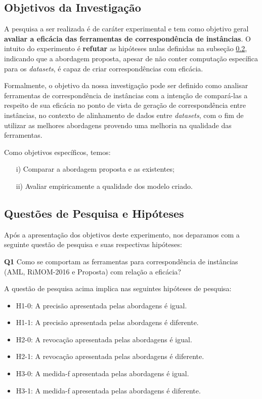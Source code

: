 \subsection{Objetivos da Investigação}
A pesquisa a ser realizada é de caráter experimental e tem como objetivo geral \textbf{avaliar a eficácia das ferramentas de correspondência de instâncias}. O intuito do experimento é \textbf{refutar} as hipóteses nulas definidas na subseção \ref{sub:hipoteses}, indicando que a abordagem proposta, apesar de não conter computação específica para os \textit{datasets}, é capaz de criar correspondências com eficácia.

Formalmente, o objetivo da nossa investigação pode ser definido como analisar ferramentas de correspondência de instâncias com a intenção de compará-las a respeito de sua eficácia no ponto de vista de geração de correspondência entre instâncias, no contexto de alinhamento de dados entre \textit{datasets}, com o fim de utilizar as melhores abordagens provendo uma melhoria na qualidade das ferramentas.

Como objetivos específicos, temos:
\begin{enumerate}
	\item[i)] Comparar a abordagem proposta e as existentes;
	\item[ii)] Avaliar empiricamente a qualidade dos modelo criado.
\end{enumerate}


\subsection{Questões de Pesquisa e Hipóteses}
\label{sub:hipoteses}
Após a apresentação dos objetivos deste experimento, nos deparamos com a seguinte questão de pesquisa e suas respectivas hipóteses:

\textbf{Q1} Como se comportam as ferramentas para correspondência de instâncias (AML, RiMOM-2016 e Proposta) com relação a eficácia? 

A questão de pesquisa acima implica nas seguintes hipóteses de pesquisa:

\begin{itemize}
\item H1-0: A precisão apresentada pelas abordagens é igual.
\item H1-1: A precisão apresentada pelas abordagens é diferente.
\item H2-0: A revocação apresentada pelas abordagens é igual.
\item H2-1: A revocação apresentada pelas abordagens é diferente.
\item H3-0: A medida-f apresentada pelas abordagens é igual.
\item H3-1: A medida-f apresentada pelas abordagens é diferente.
\end{itemize}

